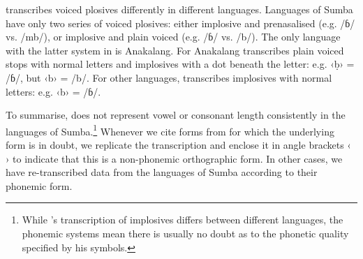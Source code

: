 \citet{Onvlee1984} transcribes voiced plosives differently in different languages.
Languages of Sumba have only two series of voiced plosives: either
implosive and prenasalised (e.g. /ɓ/ vs.
/mb/), or implosive and plain voiced (e.g. /ɓ/ vs. /b/).
The only language with the latter system in \citet{Onvlee1984} is Anakalang.
For Anakalang \citeauthor{Onvlee1984} transcribes plain voiced stops with normal
letters and implosives with a dot beneath the letter: e.g.
‹ḅ› = /ɓ/, but ‹b› = /b/.
For other languages, \citet{Onvlee1984} transcribes implosives
with normal letters: e.g. ‹b› = /ɓ/.

To summarise, \citet{Onvlee1984} does not represent vowel or
consonant length consistently in the languages of Sumba.\footnote{
		While \citeauthor{Onvlee1984}’s transcription of implosives differs between
		different languages, the phonemic systems mean there is usually no doubt as to the
		phonetic quality specified by his symbols.}
Whenever we cite
forms from \citet{Onvlee1984} for which the underlying form is
in doubt, we replicate the transcription
and enclose it in angle brackets ‹ › to indicate that this is
a non-phonemic orthographic form.
In other cases, we have re-transcribed data from the languages
of Sumba according to their phonemic form.

